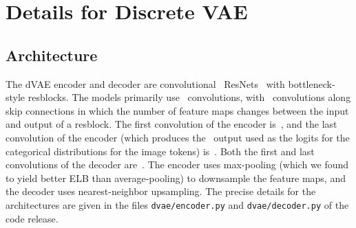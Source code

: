 \documentclass{article}
\begin{document}
\section{Details for Discrete VAE}

\subsection{Architecture}
\label{sec:dvae_arch}

The dVAE encoder and decoder are convolutional~\cite{lecun1998gradient} ResNets~\cite{he2016identity} with bottleneck-style resblocks. The models primarily use~ convolutions, with~ convolutions along skip connections in which the number of feature maps changes between the input and output of a resblock. The first convolution of the encoder is~, and the last convolution of the encoder (which produces the~ output used as the logits for the categorical distributions for the image tokens) is~. Both the first and last convolutions of the decoder are~. The encoder uses max-pooling (which we found to yield better ELB than average-pooling) to downsample the feature maps, and the decoder uses nearest-neighbor upsampling. The precise details for the architectures are given in the files \texttt{dvae/encoder.py} and \texttt{dvae/decoder.py} of the code release.
\end{document}
